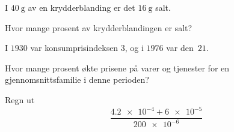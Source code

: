 %


\Oppgave[1] 

I $\SI{40}{\g}$ av en krydderblanding er det $\SI{16}{\g}$ salt. \medskip

Hvor mange prosent av krydderblandingen er salt?


\Oppgave[1] 

I $1930$ var konsumprisindeksen 3, og i $1976$ var den $21$. \medskip

Hvor mange prosent økte prisene på varer og tjenester for en
gjennomsnittsfamilie i denne perioden?


\Oppgave[2] 

Regn ut
%
\begin{equation*}
  \frac{\num{4.2e-4}+\num{6e-5}}{\num{200e-6}}
\end{equation*}


